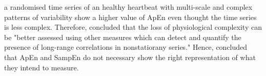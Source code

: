 a randomised time series of an healthy heartbeat with multi-scale and 
complex patterns of variability show a higher value of ApEn even thought 
the time series is less complex. Therefore, \citealt[p. 24]{goldberger2002b} 
concluded that the loss of physiological complexity can be 
"better assessed using other measures which can detect and quantify the 
presence of long-range correlations in nonstatiorany series."
Hence, \cite{goldberger2002b, vaillancourt2002, costa2002} concluded that
ApEn and SampEn do not necessary show the right representation of what 
they intend to measure. 




